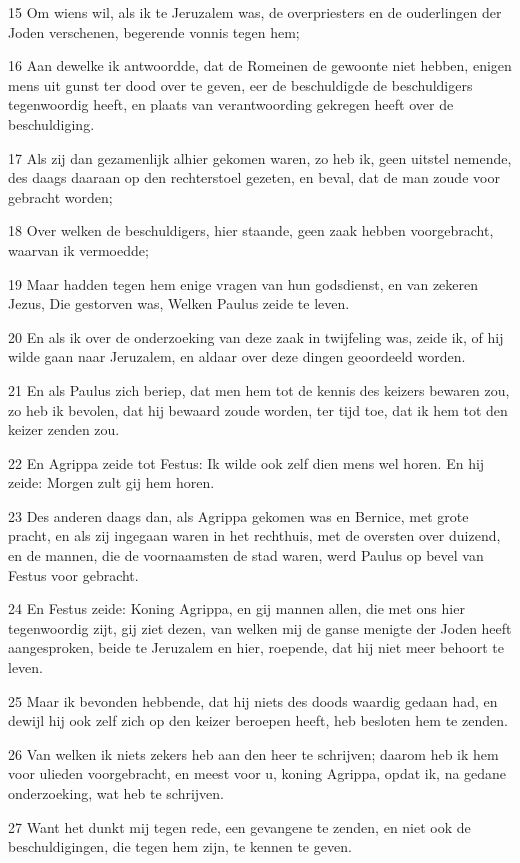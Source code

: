 \par 15 Om wiens wil, als ik te Jeruzalem was, de overpriesters en de ouderlingen der Joden verschenen, begerende vonnis tegen hem;
\par 16 Aan dewelke ik antwoordde, dat de Romeinen de gewoonte niet hebben, enigen mens uit gunst ter dood over te geven, eer de beschuldigde de beschuldigers tegenwoordig heeft, en plaats van verantwoording gekregen heeft over de beschuldiging.
\par 17 Als zij dan gezamenlijk alhier gekomen waren, zo heb ik, geen uitstel nemende, des daags daaraan op den rechterstoel gezeten, en beval, dat de man zoude voor gebracht worden;
\par 18 Over welken de beschuldigers, hier staande, geen zaak hebben voorgebracht, waarvan ik vermoedde;
\par 19 Maar hadden tegen hem enige vragen van hun godsdienst, en van zekeren Jezus, Die gestorven was, Welken Paulus zeide te leven.
\par 20 En als ik over de onderzoeking van deze zaak in twijfeling was, zeide ik, of hij wilde gaan naar Jeruzalem, en aldaar over deze dingen geoordeeld worden.
\par 21 En als Paulus zich beriep, dat men hem tot de kennis des keizers bewaren zou, zo heb ik bevolen, dat hij bewaard zoude worden, ter tijd toe, dat ik hem tot den keizer zenden zou.
\par 22 En Agrippa zeide tot Festus: Ik wilde ook zelf dien mens wel horen. En hij zeide: Morgen zult gij hem horen.
\par 23 Des anderen daags dan, als Agrippa gekomen was en Bernice, met grote pracht, en als zij ingegaan waren in het rechthuis, met de oversten over duizend, en de mannen, die de voornaamsten de stad waren, werd Paulus op bevel van Festus voor gebracht.
\par 24 En Festus zeide: Koning Agrippa, en gij mannen allen, die met ons hier tegenwoordig zijt, gij ziet dezen, van welken mij de ganse menigte der Joden heeft aangesproken, beide te Jeruzalem en hier, roepende, dat hij niet meer behoort te leven.
\par 25 Maar ik bevonden hebbende, dat hij niets des doods waardig gedaan had, en dewijl hij ook zelf zich op den keizer beroepen heeft, heb besloten hem te zenden.
\par 26 Van welken ik niets zekers heb aan den heer te schrijven; daarom heb ik hem voor ulieden voorgebracht, en meest voor u, koning Agrippa, opdat ik, na gedane onderzoeking, wat heb te schrijven.
\par 27 Want het dunkt mij tegen rede, een gevangene te zenden, en niet ook de beschuldigingen, die tegen hem zijn, te kennen te geven.


